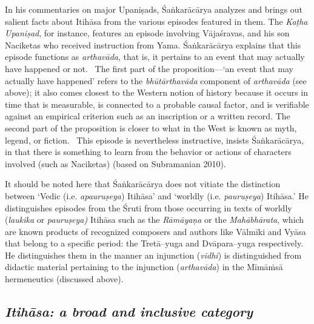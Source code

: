 In his commentaries on major Upaniṣads, Śaṅkarācārya analyzes and brings out salient facts about Itihāsa from the various episodes featured in them. The \textit{Kaṭha Upaniṣad}, for instance, features an episode involving Vājaśravas, and his son Naciketas who received instruction from Yama. Śaṅkarācārya explains that this episode functions as \textit{arthavāda}, that is, it pertains to an event that may actually have happened or not.  The first part of the proposition—‘an event that may actually have happened’ refers to the \textit{bhūtārthavāda} component of \textit{arthavāda} (see above); it also comes closest to the Western notion of history because it occurs in time that is measurable, is connected to a probable causal factor, and is verifiable against an empirical criterion such as an inscription or a written record. The second part of the proposition is closer to what in the West is known as myth, legend, or fiction.  This episode is nevertheless instructive, insists Śaṅkarācārya, in that there is something to learn from the behavior or actions of characters involved (such as Naciketas) (based on Subramanian 2010). 

It should be noted here that Śaṅkarācārya does not vitiate the distinction between ‘Vedic (i.e. \textit{apauruṣeya}) Itihāsa’ and ‘worldly (i.e. \textit{pauruṣeya}) Itihāsa.’ He distinguishes episodes from the Śruti from those occurring in texts of worldly (\textit{laukika} or \textit{pauruṣeya)} Itihāsa such as the \textit{Rāmāyaṇa} or the \textit{Mahābhārata}, which are known products of recognized composers and authors like Vālmīki and Vyāsa that belong to a specific period: the Tretā–yuga and Dvāpara–yuga respectively. He distinguishes them in the manner an injunction (\textit{vidhi}) is distinguished from didactic material pertaining to the injunction (\textit{arthavāda}) in the Mīmāṁsā hermeneutics (discussed above).


\subsection*{\textit{Itihāsa: a broad and inclusive category}}

